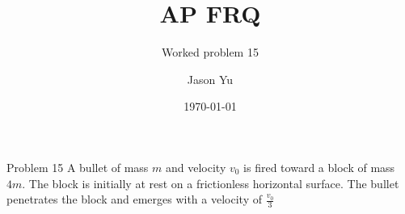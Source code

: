\documentclass[aspectratio=169]{beamer}
\author{Jason Yu}
\title{AP FRQ}
\subtitle{Worked problem 15}
\institute{University HS}
\date{\today}
\begin{document}
	\begin{frame}{Problem 15}
		A bullet of mass \(m\) and velocity \(v_0\) is fired toward a block of mass \(4m\). The block is initially at rest on a frictionless horizontal surface. The bullet penetrates the block and emerges with a velocity of \(\frac{v_0}{3}\)
		\begin{center}
			
		\end{center}
	\end{frame}
\end{document}
